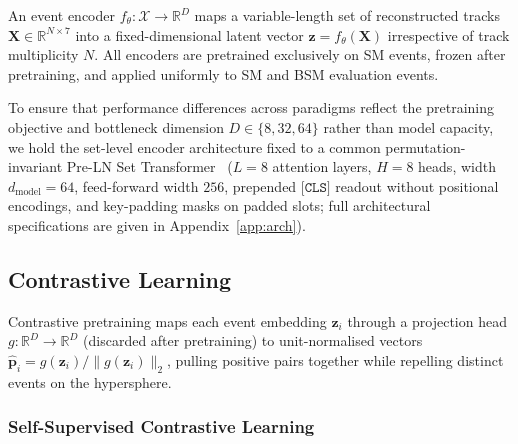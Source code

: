 \documentclass{article}
\begin{document}
An event encoder $f_\theta : \mathcal{X} \to \mathbb{R}^D$ maps a variable-length set of reconstructed tracks $\mathbf{X} \in \mathbb{R}^{N \times 7}$ into a fixed-dimensional latent vector $\mathbf{z} = f_\theta(\mathbf{X})$ irrespective of track multiplicity $N$. All encoders are pretrained exclusively on SM events, frozen after pretraining, and applied uniformly to SM and BSM evaluation events.

To ensure that performance differences across paradigms reflect the pretraining objective and bottleneck dimension $D \in \{8, 32, 64\}$ rather than model capacity, we hold the set-level encoder architecture fixed to a common permutation-invariant Pre-LN Set Transformer~\cite{SetTransformer,PreLNTransformer} ($L = 8$ attention layers, $H = 8$ heads, width $d_{\text{model}} = 64$, feed-forward width $256$, prepended $\texttt{[CLS]}$ readout without positional encodings, and key-padding masks on padded slots; full architectural specifications are given in Appendix~\ref{app:arch}).

\subsection{Contrastive Learning}

Contrastive pretraining maps each event embedding $\mathbf{z}_i$ through a projection head $g : \mathbb{R}^D \to \mathbb{R}^D$ (discarded after pretraining) to unit-normalised vectors $\hat{\mathbf{p}}_i = g(\mathbf{z}_i) / \|g(\mathbf{z}_i)\|_2$, pulling positive pairs together while repelling distinct events on the hypersphere.

\subsubsection{Self-Supervised Contrastive Learning}
\label{sec:ssl_contrastive}
\end{document}

